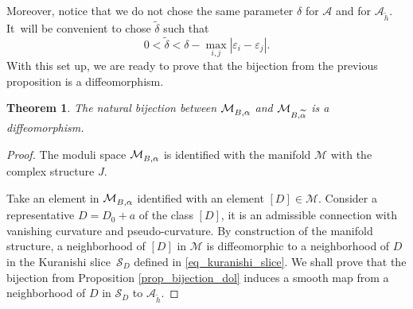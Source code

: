 \documentclass[11pt]{article}
\newcommand{\NoChangel}[1]{%
\expandafter\let\csname old\string#1\endcsname=#1
\let#1=\relax
\newcommand{#1}{\mathcode`l="716C\csname old\string#1\endcsname\mathcode`l="7160 }%
}
\newcommand{\Dol}{\mathrm{Dol}}\NoChangel{\Dol}
\let\epsilon\varepsilon
\theoremstyle{definition}
\theoremstyle{plain}
\newtheorem{theorem}[definition]{Theorem}
\begin{document}
Moreover, notice that we do not chose the same parameter $\delta$ for $\mathcal{A}$ and for $\mathcal{A}_{\widetilde{h}}$. It~will be convenient to chose $\widetilde{\delta}$ such that
\begin{equation}\label{eq_delta_t_small}
0 < \widetilde{\delta} < \delta - \max_{i,j} |\epsilon_i-\epsilon_j|.
\end{equation}
With this set up, we are ready to prove that the bijection from the previous proposition is a diffeomorphism.
\begin{theorem}\label{th_diffeo_var_alpha}
The natural bijection between $\mathcal{M}^{\Dol}_{B,\alpha}$ and $\mathcal{M}^{\Dol}_{B,\widetilde{\alpha}}$ is a diffeomorphism.
\end{theorem}
\begin{proof}
The moduli space $\mathcal{M}^{\Dol}_{B,\alpha}$ is identified with the manifold $\mathcal{M}$ with the complex structure $J$.

Take an element in $\mathcal{M}^{\Dol}_{B,\alpha}$ identified with an element $[D]\in\mathcal{M}$. Consider a representative $D=D_0+a$ of the class $[D]$, it is an admissible connection with vanishing curvature and pseudo-curvature. By construction of the manifold structure, a neighborhood of $[D]$ in $\mathcal{M}$ is diffeomorphic to a neighborhood of $D$ in the Kuranishi slice~$\mathcal{S}_{D}$ defined in \eqref{eq_kuranishi_slice}. We shall prove that the bijection from Proposition \ref{prop_bijection_dol} induces a smooth map from a neighborhood of $D$ in $\mathcal{S}_{D}$ to $\mathcal{A}_{\widetilde{h}}$.


\end{proof}
\end{document}
